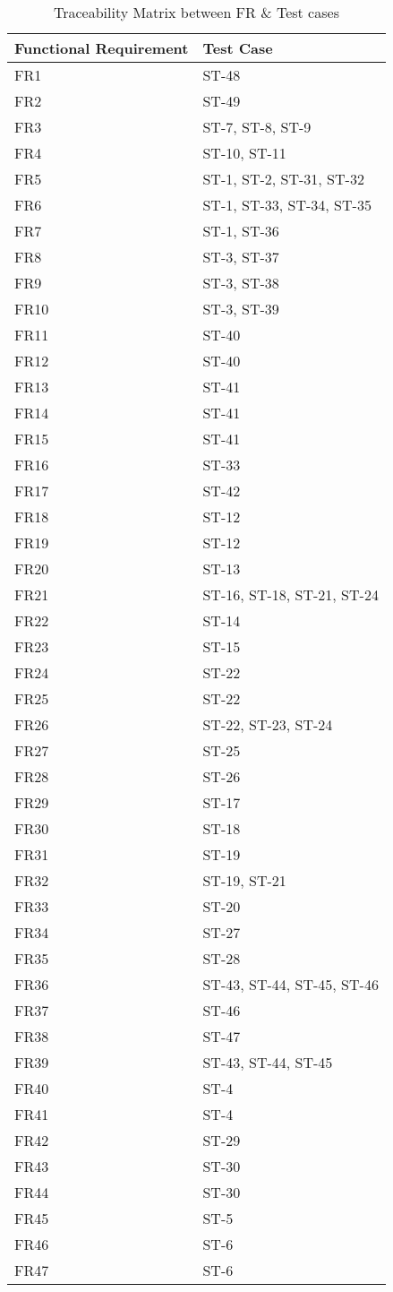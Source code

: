 \documentclass[12pt, titlepage]{article}
\begin{document}
	\begin{longtable}{|l|l|}
		\caption{Traceability Matrix between FR \& Test cases}\\
		\hline
		Functional Requirement &  Test Case\\
		\hline
		FR1  & ST-48\\
		FR2  & ST-49\\
		FR3  & ST-7, ST-8, ST-9\\
		FR4  & ST-10, ST-11\\
		FR5  & ST-1, ST-2, ST-31, ST-32\\
		FR6  & ST-1, ST-33, ST-34, ST-35\\
		FR7  & ST-1, ST-36\\
		FR8  & ST-3, ST-37\\
		FR9  & ST-3, ST-38\\
		FR10  & ST-3, ST-39\\
		FR11  & ST-40\\
		FR12  & ST-40\\
		FR13  & ST-41\\
		FR14  & ST-41\\
		FR15  & ST-41\\
		FR16  & ST-33 \\
		FR17  & ST-42\\
		FR18  & ST-12\\
		FR19  & ST-12\\
		FR20  & ST-13\\
		FR21  & ST-16, ST-18, ST-21, ST-24\\
		FR22  & ST-14\\
		FR23  & ST-15\\
		FR24  & ST-22\\
		FR25  & ST-22\\
		\hline
		\newpage
		\hline
		FR26  & ST-22, ST-23, ST-24\\
		FR27  & ST-25\\
		FR28  & ST-26\\
		FR29  & ST-17\\
		FR30  & ST-18\\
		FR31  & ST-19\\
		FR32  & ST-19, ST-21\\
		FR33  & ST-20\\
		FR34  & ST-27\\
		FR35  & ST-28\\
		FR36  & ST-43, ST-44, ST-45, ST-46\\
		FR37  & ST-46\\
		FR38  & ST-47\\
		FR39  & ST-43, ST-44, ST-45\\
		FR40  & ST-4\\
		FR41  & ST-4\\
		FR42  & ST-29\\
		FR43  & ST-30\\
		FR44  & ST-30\\
		FR45  & ST-5\\
		FR46  & ST-6\\
		FR47  & ST-6\\
		\hline
	\end{longtable}
	
\end{document}

